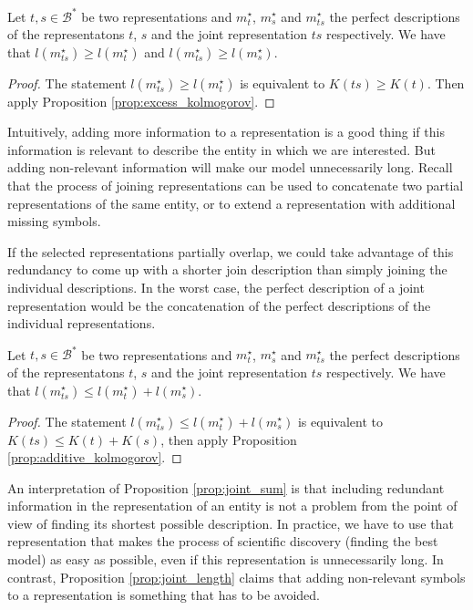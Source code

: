 \begin{proposition}
\label{prop:joint_length}
Let $t,s \in \mathcal{B}^\ast$ be two representations and $m_{t}^{\star}$, $m_{s}^{\star}$ and $m_{ts}^{\star}$ the perfect descriptions of the representatons $t$, $s$ and the joint representation $ts$ respectively. We have that $l \left( m_{ts}^{\star} \right) \geq l \left( m_{t}^{\star} \right)$ and $l \left( m_{ts}^{\star} \right) \geq l \left( m_{s}^{\star} \right)$.
\end{proposition}
\begin{proof}
The statement $l \left( m_{ts}^{\star} \right) \geq l \left( m_{t}^{\star} \right)$ is equivalent to $K(ts) \geq K(t)$. Then apply Proposition \ref{prop:excess_kolmogorov}.
\end{proof}

Intuitively, adding more information to a representation is a good thing if this information is relevant to describe the entity in which we are interested. But adding non-relevant information will make our model unnecessarily long. Recall that the process of joining representations can be used to concatenate two partial representations of the same entity, or to extend a representation with additional missing symbols.

If the selected representations partially overlap, we could take advantage of this redundancy to come up with a shorter join description than simply joining the individual descriptions. In the worst case, the perfect description of a joint representation would be the concatenation of the perfect descriptions of the individual representations.

\begin{proposition}
\label{prop:joint_sum}
Let $t,s \in \mathcal{B}^\ast$ be two representations and $m_{t}^{\star}$, $m_{s}^{\star}$ and $m_{ts}^{\star}$ the perfect descriptions of the representatons $t$, $s$ and the joint representation $ts$ respectively. We have that $l \left( m_{ts}^{\star} \right) \leq l \left( m_{t}^{\star} \right) + l \left( m_{s}^{\star} \right)$.
\end{proposition}
\begin{proof}
The statement $l \left( m_{ts}^{\star} \right) \leq l \left( m_{t}^{\star} \right) + l \left( m_{s}^{\star} \right)$ is equivalent to $K(ts) \leq K(t) + K(s)$, then apply Proposition \ref{prop:additive_kolmogorov}.
\end{proof}

{\color{red} An interpretation of Proposition \ref{prop:joint_sum} is that including redundant information in the representation of an entity is not a problem from the point of view of finding its shortest possible description. In practice, we have to use that representation that makes the process of scientific discovery (finding the best model) as easy as possible, even if this representation is unnecessarily long. In contrast, Proposition \ref{prop:joint_length} claims that adding non-relevant symbols to a representation is something that has to be avoided.}

